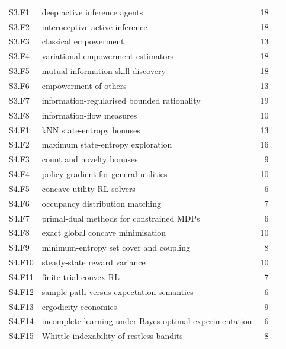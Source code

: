\documentclass[10pt]{article}
\begin{document}
{\begin{longtable}{@{}p{1.3cm}p{8.6cm}rp{4.4cm}@{}}
S3.F1 & deep active inference agents & 18 & \citet{Cullen-active18}\\
S3.F2 & interoceptive active inference & 18 & \citet{Seth-interoceptive13}\\
S3.F3 & classical empowerment & 13 & \citet{Blahut-computation72}\\
S3.F4 & variational empowerment estimators & 18 & \citet{Bastankhah-learning26}\\
S3.F5 & mutual-information skill discovery & 18 & \citet{Eysenbach-information21}\\
S3.F6 & empowerment of others & 13 & \citet{Guckelsberger-intrinsically16}\\
S3.F7 & information-regularised bounded rationality & 19 & \citet{Still-information12}\\
S3.F8 & information-flow measures & 10 & \citet{Ay-information08}\\
S4.F1 & kNN state-entropy bonuses & 13 & \citet{Badia-never20}\\
S4.F2 & maximum state-entropy exploration & 16 & \citet{Hazan-provably19}\\
S4.F3 & count and novelty bonuses & 9 & \citet{Bellemare-unifying16}\\
S4.F4 & policy gradient for general utilities & 10 & \citet{Zhang-variational20}\\
S4.F5 & concave utility RL solvers & 6 & \citet{Agarwal-concave21}\\
S4.F6 & occupancy distribution matching & 7 & \citet{Ho-generative16}\\
S4.F7 & primal-dual methods for constrained MDPs & 6 & \citet{Ding-convergence22}\\
S4.F8 & exact global concave minimisation & 10 & \citet{Falk-successive76}\\
S4.F9 & minimum-entropy set cover and coupling & 8 & \citet{Cardinal-minimum10}\\
S4.F10 & steady-state reward variance & 10 & \citet{Xia-optimization16}\\
S4.F11 & finite-trial convex RL & 7 & \citet{Mutti-challenging22}\\
S4.F12 & sample-path versus expectation semantics & 6 & \citet{Ross-sample87}\\
S4.F13 & ergodicity economics & 9 & \citet{Kelly-new56}\\
S4.F14 & incomplete learning under Bayes-optimal experimentation & 6 & \citet{Rothschild-twoarmed74}\\
S4.F15 & Whittle indexability of restless bandits & 8 & \citet{NinoMora-restless01}\\

\end{longtable}}
\end{document}
